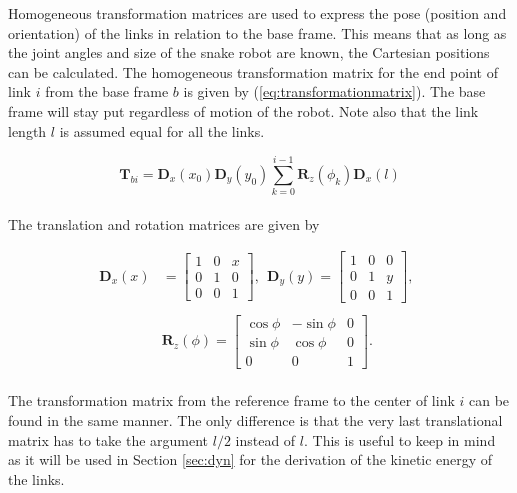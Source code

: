 Homogeneous transformation matrices are used to express the pose (position and orientation) of the links in relation to the base frame. This means that as long as the joint angles and size of the snake robot are known, the Cartesian positions can be calculated.
The homogeneous transformation matrix for the end point of link $i$ from the base frame $b$ is given by (\ref{eq:transformationmatrix}). The base frame will stay put regardless of motion of the robot. Note also that the link length $l$ is assumed equal for all the links.

\begin{equation} \label{eq:transformationmatrix}
    \textbf{T}_{b i} = \textbf{D}_x(x_0) \textbf{D}_y(y_0) \sum_{k=0}^{i-1} \textbf{R}_z(\phi_k) \textbf{D}_x(l)
\end{equation}
\\
The translation and rotation matrices are given by

\begin{equation}\label{eq:trans_rot}
    \begin{split}
        \textbf{D}_x(x)& = 
        \begin{bmatrix}
            1 & 0 & x \\
            0 & 1 & 0 \\
            0 & 0 & 1
        \end{bmatrix}, \ \
        \textbf{D}_y(y) =
        \begin{bmatrix}
            1 & 0 & 0 \\
            0 & 1 & y \\
            0 & 0 & 1
        \end{bmatrix}, \ \
        \\&
        \\&\textbf{R}_z(\phi) =
        \begin{bmatrix}
            \cos{\phi} & -\sin{\phi} & 0 \\
            \sin{\phi} &  \cos{\phi} & 0 \\
            0          &  0          & 1
        \end{bmatrix}.
    \end{split}
\end{equation}
\\
The transformation matrix from the reference frame to the center of link $i$ can be found in the same manner. The only difference is that the very last translational matrix has to take the argument $l/2$ instead of $l$. This is useful to keep in mind as it will be used in Section \ref{sec:dyn} for the derivation of the kinetic energy of the links.

